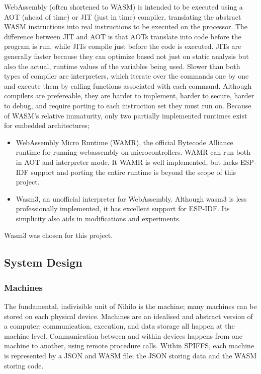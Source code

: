 \documentclass{article}
\begin{document}
WebAssembly (often shortened to WASM) is intended to be executed using a AOT (ahead of time)  or JIT (just in time) compiler, translating the abstract WASM instructions into real instructions to be executed on the processor.
The difference between JIT and AOT is that AOTs translate into code before the program is run, while JITs compile just before the code is executed.
JITs are generally faster because they can optimize based not just on static analysis but also the actual, runtime values of the variables being used.
Slower than both types of compiler are interpreters, which iterate over the commands one by one and execute them by calling functions associated with each command.
Although compilers are prefereable, they are harder to implement, harder to secure, harder to debug, and require porting to each instruction set they must run on.
Because of WASM's relative immaturity, only two partially implemented runtimes exist for embedded architectures;
\begin{itemize}
\item WebAssembly Micro Runtime (WAMR), the official Bytecode Alliance runtime for running webassembly on microcontrollers.
WAMR can run both in AOT and interpreter mode.
It WAMR is well implemented, but lacks ESP-IDF support and porting the entire runtime is beyond the scope of this project.
\item Wasm3, an unofficial interpreter for WebAssembly. 
Although wasm3 is less professionally implemented, it has excellent support for ESP-IDF.
Its simplicity also aids in modifications and experiments. 
\end{itemize}

Wasm3 was chosen for this project.

\subsection{System Design}
\subsubsection{Machines}

The fundamental, indivisible unit of Nihilo is the machine; many machines can be stored on each physical device. Machines are an idealised and abstract version of a computer; communication, execution, and data storage all happen at the machine level. Communication between and within devices happens from one machine to another, using remote procedure calls. Within SPIFFS, each machine is represented by a JSON and WASM file; the JSON storing data and the WASM storing code.
\end{document}
